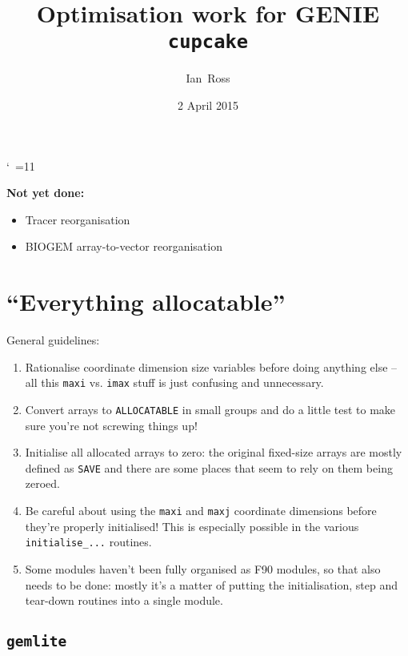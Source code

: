 \documentclass[a4paper,10pt,article]{memoir}
\title{Optimisation work for GENIE \texttt{cupcake}}
\author{Ian~Ross}
\date{2 April 2015}
\begin{document}
\catcode`~=11    %

\maketitle

\textbf{Not yet done:}
\begin{itemize}
  \item{Tracer reorganisation}
  \item{BIOGEM array-to-vector reorganisation}
\end{itemize}

\chapter{``Everything allocatable''}

General guidelines:
\begin{enumerate}
  \item{Rationalise coordinate dimension size variables before doing
    anything else -- all this \texttt{maxi} vs. \texttt{imax} stuff is
    just confusing and unnecessary.}
  \item{Convert arrays to \texttt{ALLOCATABLE} in small groups and do
    a little test to make sure you're not screwing things up!}
  \item{Initialise all allocated arrays to zero: the original
    fixed-size arrays are mostly defined as \texttt{SAVE} and there
    are some places that seem to rely on them being zeroed.}
  \item{Be careful about using the \texttt{maxi} and \texttt{maxj}
    coordinate dimensions before they're properly initialised!  This
    is especially possible in the various \texttt{initialise\_...}
    routines.}
  \item{Some modules haven't been fully organised as F90 modules, so
    that also needs to be done: mostly it's a matter of putting the
    initialisation, step and tear-down routines into a single module.}
\end{enumerate}

\section{\texttt{gemlite}}
\end{document}
